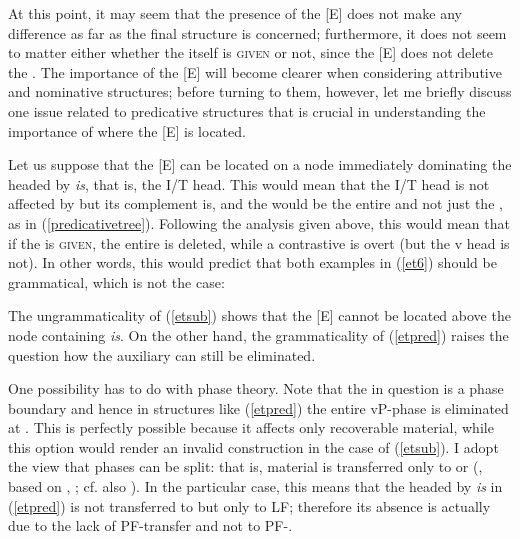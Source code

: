 At this point, it may seem that the presence of the [E]  does not make any difference as far as the final structure is concerned; furthermore, it does not seem to matter either whether the  itself is \textsc{given} or not, since the [E]  does not delete the . The importance of the [E]  will become clearer when considering attributive and nominative structures; before turning to them, however, let me briefly discuss one issue related to predicative structures that is crucial in understanding the importance of where the [E]  is located.

Let us suppose that the [E]  can be located on a node immediately dominating the  headed by \textit{is}, that is, the I/T head. This would mean that the I/T head is not affected by  but its complement is, and the  would be the entire  and not just the , as in (\ref{predicativetree}). Following the analysis given above, this would mean that if the  is \textsc{given}, the entire  is deleted, while a contrastive  is overt (but the v head is not). In other words, this would predict that both examples in (\ref{et6}) should be grammatical, which is not the case:

\ea \label{et6}
 \label{etpred}
 \label{etsub}
\z
\z

The ungrammaticality of (\ref{etsub}) shows that the [E]  cannot be located above the  node containing \textit{is}. On the other hand, the grammaticality of (\ref{etpred}) raises the question how the auxiliary can still be eliminated. 

One possibility has to do with phase theory. Note that the  in question is a phase boundary and hence in structures like (\ref{etpred}) the entire vP-phase is eliminated at . This is perfectly possible because it affects only recoverable material, while this option would render an invalid construction in the case of (\ref{etsub}). I adopt the view that phases can be split: that is, material is transferred only to  or  (\citealt[129--130]{marusic2005}, based on \citealt{felser2004}, \citealt{bobaljikwurmbrand2005}; cf. also \citealt{marusiczaucer2006}). In the particular case, this means that the  headed by \textit{is} in (\ref{etpred}) is not transferred to  but only to LF; therefore its absence is actually due to the lack of PF-transfer and not to PF-.

